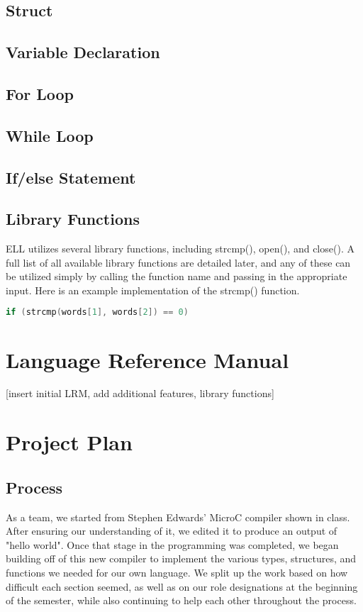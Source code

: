 \documentclass{article}
\begin{document}
\subsection{Struct}

\subsection{Variable Declaration}

\subsection{For Loop}

\subsection{While Loop}

\subsection{If/else Statement}

\subsection{Library Functions}
ELL utilizes several library functions, including strcmp(), open(), and close(). A full list of all available library functions are detailed later, and any of these can be utilized simply by calling the function name and passing in the appropriate input. Here is an example implementation of the strcmp() function. 
\begin{lstlisting}[language=C]
if (strcmp(words[1], words[2]) == 0)
\end{lstlisting}

\newpage
\section{Language Reference Manual}
[insert initial LRM, add additional features, library functions]


\newpage
\section{Project Plan}
\subsection{Process}
As a team, we started from Stephen Edwards' MicroC compiler shown in class. After ensuring our understanding of it, we edited it to produce an output of "hello world". Once that stage in the programming was completed, we began building off of this new compiler to implement the various types, structures, and functions we needed for our own language. We split up the work based on how difficult each section seemed, as well as on our role designations at the beginning of the semester, while also continuing to help each other throughout the process.
\end{document}
